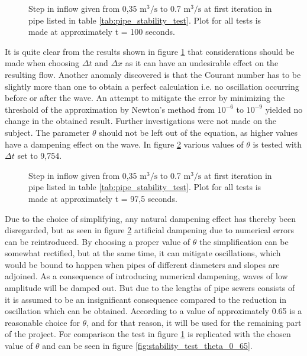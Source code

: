 \begin{figure}[H]
 \centering
 
\caption{Step in inflow given from 0,35 $\text{m}^\text{3}/ \text{s}$ to 0.7 $\text{m}^\text{3}/ \text{s}$ at first iteration in pipe listed in table \ref{tab:pipe_stability_test}. Plot for all tests is made at approximately t = 100 seconds.}
\label{fig:stability_test_theta_0_5}
\end{figure}

It is quite clear from the results shown in figure \ref{fig:stability_test_theta_0_5} that considerations should be made when choosing $\Delta t$ and $\Delta x$ as it can have an undesirable effect on the resulting flow. Another anomaly discovered is that the Courant number has to be slightly more than one to obtain a perfect calculation i.e. no oscillation occurring before or after the wave. An attempt to mitigate the error by minimizing the threshold of the approximation by Newton's method from $10^{-6}$ to $10^{-9}$ yielded no change in the obtained result. Further investigations were not made on the subject.
The parameter $\theta$ should not be left out of the equation, as higher values have a dampening effect on the wave. In figure \ref{fig:stability_theta_test_05_065_1} various values of $\theta$ is tested  with $\Delta t$ set to 9,754.    

\begin{figure}[H]
 \centering
 
\caption{Step in inflow given from 0,35 $\text{m}^\text{3}/ \text{s}$ to 0.7 $\text{m}^\text{3}/ \text{s}$ at first iteration in pipe listed in table \ref{tab:pipe_stability_test}. Plot for all tests is made at approximately t = 97,5 seconds.}
\label{fig:stability_theta_test_05_065_1}
\end{figure}

Due to the choice of simplifying, any natural dampening effect has thereby been disregarded, but as seen in figure \ref{fig:stability_theta_test_05_065_1} artificial dampening due to numerical errors can be reintroduced. By choosing a proper value of $\theta$ the simplification can be somewhat rectified, but at the same time, it can mitigate oscillations, which would be bound to happen when pipes of different diameters and slopes are adjoined. As a consequence of introducing numerical dampening, waves of low amplitude will be damped out. But due to the lengths of pipe sewers consists of it is assumed to be an insignificant consequence compared to the reduction in oscillation which can be obtained. According to \cite{cunge1980practical} a value of approximately 0.65 is a reasonable choice for $\theta$, and for that reason, it will be used for the remaining part of the project. For comparison the test in figure \ref{fig:stability_test_theta_0_5} is replicated with the chosen value of $\theta$ and can be seen in figure \ref{fig:stability_test_theta_0_65}.


